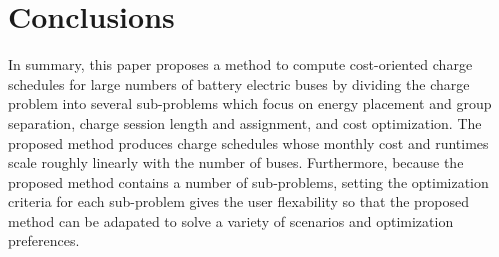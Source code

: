 \section{Conclusions}
In summary, this paper proposes a method to compute cost-oriented charge schedules for large numbers of battery electric buses by dividing the charge problem into several sub-problems which focus on energy placement and group separation, charge session length and assignment, and cost optimization. The proposed method produces charge schedules whose monthly cost and runtimes scale roughly linearly with the number of buses. 
Furthermore, because the proposed method contains a number of sub-problems, setting the optimization criteria for each sub-problem gives the user flexability so that the proposed method can be adapated to solve a variety of scenarios and optimization preferences.
